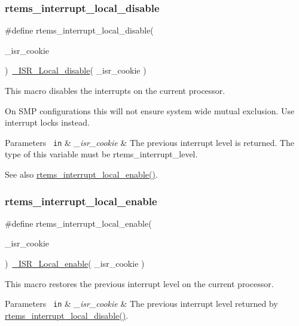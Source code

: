 \subsubsection{\texorpdfstring{rtems\_interrupt\_local\_disable}{rtems\_interrupt\_local\_disable}}
{\footnotesize\ttfamily \#define rtems\+\_\+interrupt\+\_\+local\+\_\+disable(\begin{DoxyParamCaption}\item[{}]{\+\_\+isr\+\_\+cookie }\end{DoxyParamCaption})~\mbox{\hyperlink{group__RTEMSScoreISR_ga2a829f51f98576aa596562985e1df2fc}{\+\_\+\+I\+S\+R\+\_\+\+Local\+\_\+disable}}( \+\_\+isr\+\_\+cookie )}



This macro disables the interrupts on the current processor. 

On S\+MP configurations this will not ensure system wide mutual exclusion. Use interrupt locks instead.


\begin{DoxyParams}[1]{Parameters}
\mbox{\texttt{ in}}  & {\em \+\_\+isr\+\_\+cookie} & The previous interrupt level is returned. The type of this variable must be rtems\+\_\+interrupt\+\_\+level.\\
\hline
\end{DoxyParams}
\begin{DoxySeeAlso}{See also}
\mbox{\hyperlink{group__ClassicINTR_gabd2556ab8902ebb660b470e144bdc55a}{rtems\+\_\+interrupt\+\_\+local\+\_\+enable()}}. 
\end{DoxySeeAlso}
\mbox{\label{group__ClassicINTR_gabd2556ab8902ebb660b470e144bdc55a}} 
\subsubsection{\texorpdfstring{rtems\_interrupt\_local\_enable}{rtems\_interrupt\_local\_enable}}
{\footnotesize\ttfamily \#define rtems\+\_\+interrupt\+\_\+local\+\_\+enable(\begin{DoxyParamCaption}\item[{}]{\+\_\+isr\+\_\+cookie }\end{DoxyParamCaption})~\mbox{\hyperlink{group__RTEMSScoreISR_ga508f5a32655cb590906a477b5a8174f1}{\+\_\+\+I\+S\+R\+\_\+\+Local\+\_\+enable}}( \+\_\+isr\+\_\+cookie )}



This macro restores the previous interrupt level on the current processor. 


\begin{DoxyParams}[1]{Parameters}
\mbox{\texttt{ in}}  & {\em \+\_\+isr\+\_\+cookie} & The previous interrupt level returned by \mbox{\hyperlink{group__ClassicINTR_ga691a9f609c9d6bf071d0966b8b715fab}{rtems\+\_\+interrupt\+\_\+local\+\_\+disable()}}. \\
\hline
\end{DoxyParams}
